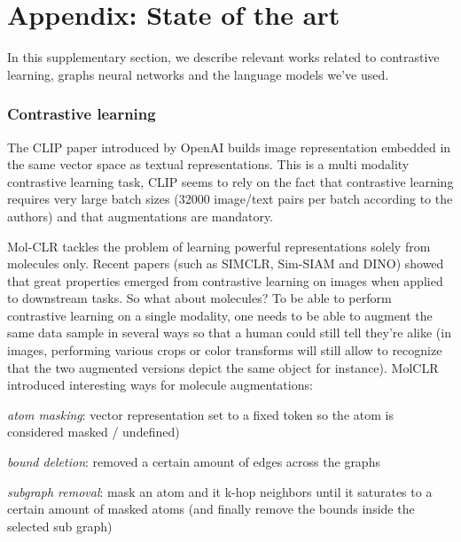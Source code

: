 \clearpage
\section{Appendix: State of the art}
\label{sec:sota_long_version}
In this supplementary section, we describe relevant works related to contrastive learning, graphs neural networks and the language models we've used.


\subsubsection{Contrastive learning}
\label{sec:clip}
The CLIP \cite{CLIP} paper introduced by OpenAI builds image representation embedded in the same vector space as textual representations. This is a multi modality contrastive learning task, CLIP seems to rely on the fact that contrastive learning requires very large batch sizes (32000 image/text pairs per batch according to the authors) and that augmentations are mandatory.

Mol-CLR \cite{molCLR} tackles the problem of learning powerful representations solely from molecules only. Recent papers (such as SIMCLR\cite{SIMCLR}, Sim-SIAM \cite{simSIAM} and DINO\cite{DINO}) showed that great properties emerged from contrastive learning on images when applied to downstream tasks. So what about molecules? To be able to perform contrastive learning on a single modality, one needs to be able to augment the same data sample in several ways so that a human could still tell they're alike (in images, performing various crops or color transforms will still allow to recognize that the two augmented versions depict the same object for instance). MolCLR introduced interesting ways for molecule augmentations:

\textit{atom masking}: vector representation set to a fixed token so the atom is considered masked / undefined)

\textit{bound deletion}: removed a certain amount of edges across the graphs

\textit{subgraph removal}: mask an atom and it k-hop neighbors until it saturates to a certain amount of masked atoms (and finally remove the bounds inside the selected sub graph)

